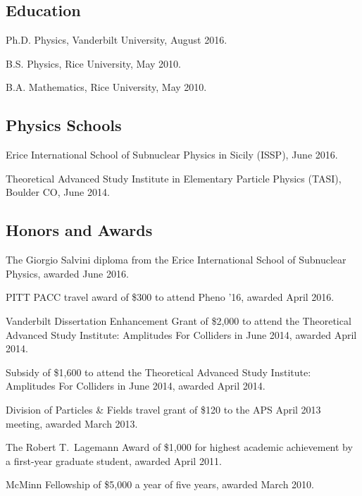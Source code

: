 \documentclass[letterpaper]{article}
\renewenvironment{itemize}{
\begin{list}{}{
\setlength{\leftmargin}{.5em}}}{
\end{list}}
\begin{document}
\subsection*{Education}
\begin{itemize}
\item Ph.D. Physics, Vanderbilt University, August 2016.
\item B.S. Physics, Rice University, May 2010.
\item B.A. Mathematics, Rice University, May 2010.
\end{itemize}

\subsection*{Physics Schools}
\begin{itemize}
\item Erice International School of Subnuclear Physics in Sicily (ISSP), June 2016.
\item Theoretical Advanced Study Institute in Elementary Particle Physics (TASI), Boulder CO, June 2014.
\end{itemize}

\subsection*{Honors and Awards}
\begin{itemize}
\item The Giorgio Salvini diploma from the Erice International School of Subnuclear Physics, awarded June 2016.
\item PITT PACC travel award of \$300 to attend Pheno '16, awarded April 2016.
\item Vanderbilt Dissertation Enhancement Grant of \$2,000 to attend the Theoretical Advanced Study Institute: Amplitudes For Colliders
in June 2014, awarded April 2014.
\item Subsidy of \$1,600 to attend the Theoretical Advanced Study Institute: Amplitudes For Colliders in June 2014, awarded April 2014.
\item Division of Particles \& Fields travel grant of \$120 to the APS April 2013 meeting, awarded March 2013.
\item The Robert T.~Lagemann Award of \$1,000 for highest academic achievement by a first-year graduate student, awarded April 2011.
\item McMinn Fellowship of \$5,000 a year of five years, awarded March 2010.
\end{itemize}
\end{document}
